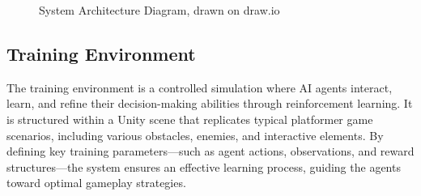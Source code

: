 \documentclass[12pt,oneside,openright,a4paper]{cpe-english-project}
\begin{document}
\begin{figure}[!h]
\centering
{}
\caption{System Architecture Diagram, drawn on draw.io}\label{fig:SystemDiagram}
\end{figure}
\FloatBarrier
\subsection{Training Environment}
The training environment is a controlled simulation where AI agents interact, learn, and refine their decision-making abilities through reinforcement learning. It is structured within a Unity scene that replicates typical platformer game scenarios, including various obstacles, enemies, and interactive elements. By defining key training parameters—such as agent actions, observations, and reward structures—the system ensures an effective learning process, guiding the agents toward optimal gameplay strategies.
\end{document}

